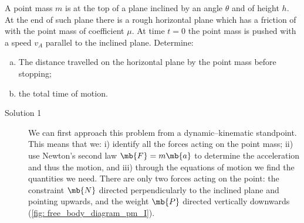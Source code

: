 A point mass $m$ is at the top of a plane inclined by an angle $\theta$ and of height $h$. At the end of such plane there is a rough horizontal plane which has a friction of with the point mass of coefficient $\mu$. At time $t=0$ the point mass is pushed with a speed $v_A$ parallel to the inclined plane. Determine:
\begin{enumerate}[(a)]
    \item The distance travelled on the horizontal plane by the point mass before stopping;
    \item the total time of motion.
\end{enumerate}
\begin{description}
    \item[Solution 1] We can first approach this problem from a dynamic--kinematic standpoint. This means that we: i) identify all the forces acting on the point mass; ii) use Newton's second law $\mb{F} = m \mb{a}$ to determine the acceleration and thus the motion, and iii) through the equations of motion we find the quantities we need. There are only two forces acting on the point: the constraint $\mb{N}$ directed perpendicularly to the inclined plane and pointing upwards, and the weight $\mb{P}$ directed vertically downwards (\cref{fig: free_body_diagram_pm_I}). 
    \begin{figure}
        \begin{center}
\end{center}
\end{figure}
\end{description}
